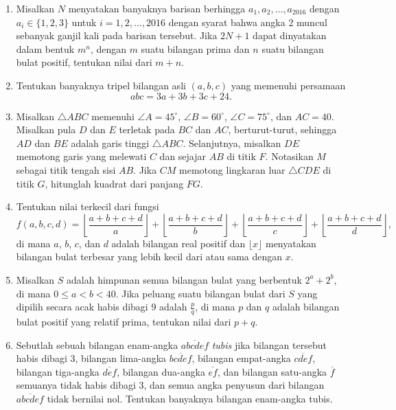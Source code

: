 \documentclass[bahasa, a4paper,12pt]{article}
\begin{document}
\begin{enumerate}
\item Misalkan $N$ menyatakan banyaknya barisan berhingga $a_1,a_2,\dotsc,a_{2016}$ dengan $a_i\in \{1,2,3\}$ untuk $i=1,2,\dotsc,2016$ dengan syarat bahwa angka 2 muncul sebanyak ganjil kali pada barisan tersebut. Jika $2N+1$ dapat dinyatakan dalam bentuk $m^n$, dengan $m$ suatu bilangan prima dan $n$ suatu bilangan bulat positif, tentukan nilai dari $m+n$.

\item Tentukan banyaknya tripel bilangan asli $(a,b,c)$ yang memenuhi persamaan \[abc=3a+3b+3c+24.\]

\item Misalkan $\triangle ABC$ memenuhi $\angle A=45^\circ$, $\angle B=60^\circ$, $\angle C=75^\circ$, dan $AC=40$. Misalkan pula $D$ dan $E$ terletak pada $BC$ dan $AC$, berturut-turut, sehingga $AD$ dan $BE$ adalah garis tinggi $\triangle ABC$. Selanjutnya, misalkan $DE$ memotong garis yang melewati $C$ dan sejajar $AB$ di titik $F$. Notasikan $M$ sebagai titik tengah sisi $AB$. Jika $CM$ memotong lingkaran luar $\triangle CDE$ di titik $G$, hitunglah kuadrat dari panjang $FG$.

\item Tentukan nilai terkecil dari fungsi \[f(a,b,c,d)=\left\lfloor\frac{a+b+c+d}{a}\right\rfloor + \left\lfloor\frac{a+b+c+d}{b}\right\rfloor + \left\lfloor\frac{a+b+c+d}{c}\right\rfloor + \left\lfloor\frac{a+b+c+d}{d}\right\rfloor,\] di mana $a$, $b$, $c$, dan $d$ adalah bilangan real positif dan $\lfloor{x}\rfloor$ menyatakan bilangan bulat terbesar yang lebih kecil dari atau sama dengan $x$.

\item Misalkan $S$ adalah himpunan semua bilangan bulat yang berbentuk $2^a + 2^b$, di mana $0 \leq a < b < 40$. Jika peluang suatu bilangan bulat dari $S$ yang dipilih secara acak habis dibagi 9 adalah $\frac{p}{q}$, di mana $p$ dan $q$ adalah bilangan bulat positif yang relatif prima, tentukan nilai dari $p + q$.

\item Sebutlah sebuah bilangan enam-angka $\overline{abcdef}$ \textit{tubis} jika bilangan tersebut habis dibagi 3, bilangan lima-angka $\overline{bcdef}$, bilangan empat-angka $\overline{cdef}$, bilangan tiga-angka $\overline{def}$, bilangan dua-angka $\overline{ef}$, dan bilangan satu-angka $\overline{f}$ semuanya tidak habis dibagi 3, dan semua angka penyusun dari bilangan $\overline{abcdef}$ tidak bernilai nol. Tentukan banyaknya bilangan enam-angka tubis.

\end{enumerate}
\end{document}
